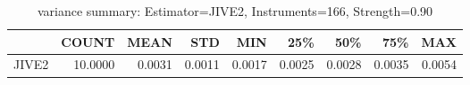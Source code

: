 \begin{table}[ht]
\centering
\caption{variance summary: Estimator=JIVE2, Instruments=166, Strength=0.90}
\begin{tabular}{lrrrrrrrr}
\toprule
 & COUNT & MEAN & STD & MIN & 25\% & 50\% & 75\% & MAX \\
\midrule
JIVE2 & 10.0000 & 0.0031 & 0.0011 & 0.0017 & 0.0025 & 0.0028 & 0.0035 & 0.0054 \\
\bottomrule
\end{tabular}
\end{table}
